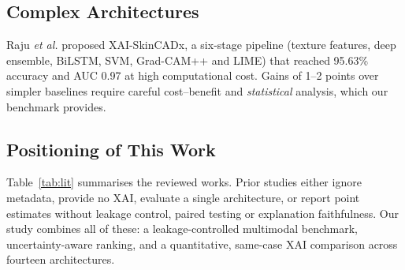\documentclass[journal]{IEEEtran}
\begin{document}
\subsection{Complex Architectures}
Raju \textit{et al.} \cite{raju2025} proposed XAI-SkinCADx, a six-stage pipeline (texture features, deep ensemble, BiLSTM, SVM, Grad-CAM++ and LIME) that reached 95.63\% accuracy and AUC 0.97 at high computational cost. Gains of 1--2 points over simpler baselines require careful cost--benefit and \emph{statistical} analysis, which our benchmark provides.

\subsection{Positioning of This Work}
Table~\ref{tab:lit} summarises the reviewed works. Prior studies either ignore metadata, provide no XAI, evaluate a single architecture, or report point estimates without leakage control, paired testing or explanation faithfulness. Our study combines all of these: a leakage-controlled multimodal benchmark, uncertainty-aware ranking, and a quantitative, same-case XAI comparison across fourteen architectures.
\end{document}
